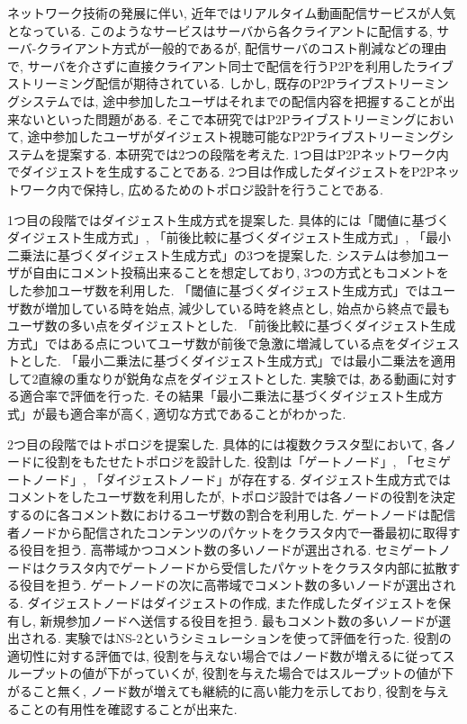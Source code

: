 ネットワーク技術の発展に伴い, 近年ではリアルタイム動画配信サービスが人気となっている. このようなサービスはサーバから各クライアントに配信する, サーバ-クライアント方式が一般的であるが, 配信サーバのコスト削減などの理由で, サーバを介さずに直接クライアント同士で配信を行うP2Pを利用したライブストリーミング配信が期待されている. しかし, 既存のP2Pライブストリーミングシステムでは, 途中参加したユーザはそれまでの配信内容を把握することが出来ないといった問題がある. そこで本研究ではP2Pライブストリーミングにおいて, 途中参加したユーザがダイジェスト視聴可能なP2Pライブストリーミングシステムを提案する. 本研究では2つの段階を考えた. 1つ目はP2Pネットワーク内でダイジェストを生成することである. 2つ目は作成したダイジェストをP2Pネットワーク内で保持し, 広めるためのトポロジ設計を行うことである.

1つ目の段階ではダイジェスト生成方式を提案した. 具体的には「閾値に基づくダイジェスト生成方式」, 「前後比較に基づくダイジェスト生成方式」, 「最小二乗法に基づくダイジェスト生成方式」の3つを提案した. システムは参加ユーザが自由にコメント投稿出来ることを想定しており, 3つの方式ともコメントをした参加ユーザ数を利用した. 「閾値に基づくダイジェスト生成方式」ではユーザ数が増加している時を始点, 減少している時を終点とし, 始点から終点で最もユーザ数の多い点をダイジェストとした. 「前後比較に基づくダイジェスト生成方式」ではある点についてユーザ数が前後で急激に増減している点をダイジェストとした. 「最小二乗法に基づくダイジェスト生成方式」では最小二乗法を適用して2直線の重なりが鋭角な点をダイジェストとした. 実験では, ある動画に対する適合率で評価を行った. その結果「最小二乗法に基づくダイジェスト生成方式」が最も適合率が高く, 適切な方式であることがわかった.

2つ目の段階ではトポロジを提案した. 具体的には複数クラスタ型において, 各ノードに役割をもたせたトポロジを設計した. 役割は「ゲートノード」, 「セミゲートノード」, 「ダイジェストノード」が存在する. ダイジェスト生成方式ではコメントをしたユーザ数を利用したが, トポロジ設計では各ノードの役割を決定するのに各コメント数におけるユーザ数の割合を利用した. ゲートノードは配信者ノードから配信されたコンテンツのパケットをクラスタ内で一番最初に取得する役目を担う. 高帯域かつコメント数の多いノードが選出される. セミゲートノードはクラスタ内でゲートノードから受信したパケットをクラスタ内部に拡散する役目を担う. ゲートノードの次に高帯域でコメント数の多いノードが選出される. ダイジェストノードはダイジェストの作成, また作成したダイジェストを保有し, 新規参加ノードへ送信する役目を担う. 最もコメント数の多いノードが選出される. 実験ではNS-2というシミュレーションを使って評価を行った. 役割の適切性に対する評価では, 役割を与えない場合ではノード数が増えるに従ってスループットの値が下がっていくが, 役割を与えた場合ではスループットの値が下がること無く, ノード数が増えても継続的に高い能力を示しており, 役割を与えることの有用性を確認することが出来た.
